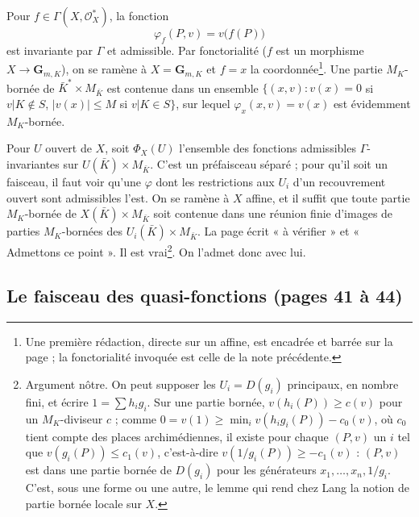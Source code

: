 \documentclass[11pt,a4paper]{article}
\begin{document}
Pour $f \in \Gamma(X, \mathcal{O}_X^*)$, la fonction
\[
  \varphi_f(P, v) = v\bigl(f(P)\bigr)
\]
est invariante par $\Gamma$ et admissible. Par fonctorialité ($f$ est un
morphisme $X \to \mathbf{G}_{m,K}$), on se ramène à $X = \mathbf{G}_{m,K}$
et $f = x$ la coordonnée\footnote{Une première rédaction, directe sur un
affine, est encadrée et barrée sur la page ; la fonctorialité invoquée est
celle de la note précédente.}. Une partie $M_K$-bornée de $\bar K^* \times
M_{\bar K}$ est contenue dans un ensemble $\{(x, v) : v(x) = 0$ si $v|K
\notin S$, $|v(x)| \leqslant M$ si $v|K \in S\}$, sur lequel $\varphi_x(x, v)
= v(x)$ est évidemment $M_K$-bornée.

Pour $U$ ouvert de $X$, soit $\Phi_X(U)$ l'ensemble des fonctions admissibles
$\Gamma$-invariantes sur $U(\bar K) \times M_{\bar K}$. C'est un préfaisceau
séparé ; pour qu'il soit un faisceau, il faut voir qu'une $\varphi$ dont les
restrictions aux $U_i$ d'un recouvrement ouvert sont admissibles l'est. On
se ramène à $X$ affine, et il suffit que toute partie $M_K$-bornée de
$X(\bar K) \times M_{\bar K}$ soit contenue dans une réunion finie d'images
de parties $M_K$-bornées des $U_i(\bar K) \times M_{\bar K}$. La page écrit
« à vérifier » et « Admettons ce point ». Il est vrai\footnote{Argument
nôtre. On peut supposer les $U_i = D(g_i)$ principaux, en nombre fini, et
écrire $1 = \sum h_i g_i$. Sur une partie bornée, $v(h_i(P)) \geqslant c(v)$
pour un $M_K$-diviseur $c$ ; comme $0 = v(1) \geqslant \min_i v(h_i g_i(P))
- c_0(v)$, où $c_0$ tient compte des places archimédiennes, il existe pour
chaque $(P, v)$ un $i$ tel que $v(g_i(P)) \leqslant c_1(v)$, c'est-à-dire
$v(1/g_i(P)) \geqslant -c_1(v)$ : $(P, v)$ est dans une partie bornée de
$D(g_i)$ pour les générateurs $x_1, \ldots, x_n, 1/g_i$. C'est, sous une
forme ou une autre, le lemme qui rend chez Lang la notion de partie bornée
locale sur $X$.}. On l'admet donc avec lui.

\subsection*{Le faisceau des quasi-fonctions (pages 41 à 44)}
\end{document}
